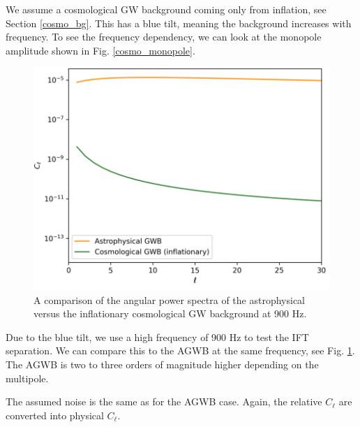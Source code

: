 We assume a cosmological GW background coming only from inflation, see Section \ref{cosmo_bg}. This has a blue tilt, meaning the background increases with frequency. To see the frequency dependency, we can look at the monopole amplitude shown in Fig. \ref{cosmo_monopole}.



\begin{figure}[h]
    \centering
    \includegraphics[width=0.6\linewidth]{Images/astro_vs_cosmo.png}
    \caption{A comparison of the angular power spectra of the astrophysical versus the inflationary cosmological GW background at 900 Hz.}
    \label{astro_cosmo}
\end{figure} 

Due to the blue tilt, we use a high frequency of 900 Hz to test the IFT separation.
We can compare this to the AGWB at the same frequency, see Fig. \ref{astro_cosmo}. The AGWB is two to three orders of magnitude higher depending on the multipole. 


The assumed noise is the same as for the AGWB case. Again, the relative $C_\ell$ are converted into physical $C_\ell$.

